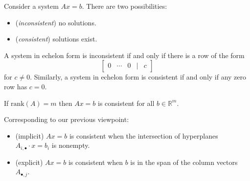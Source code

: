 \documentclass[12pt]{article}
\begin{document}
\begin{definition}
	Consider a system $Ax=b$. There are two possibilities:
	\begin{itemize}
		\item (\emph{inconsistent}) no solutions. 
		\item (\emph{consistent}) solutions exist.
	\end{itemize}
\end{definition}

\begin{corollary}
	A system in echelon form is inconsistent if and only if there is a row of the form 
	\begin{equation*}
		\begin{bmatrix} 0 & \cdots & 0 & | & c \end{bmatrix}
	\end{equation*}
	for $c\neq 0$. Similarly, a system in echelon form is consistent if and only if any zero row has $c=0$.
\end{corollary}

\begin{corollary}
	If $\text{rank}(A)=m$ then $Ax=b$ is consistent for all $b\in\mathbb{R}^m$.
\end{corollary}

\begin{remark}
	Corresponding to our previous viewpoint:
	\begin{itemize}
		\item (implicit) $Ax=b$ is consistent when the intersection of hyperplanes $A_{i,\bullet}\cdot x=b_i$ is nonempty.
		\item (explicit) $Ax=b$ is consistent when $b$ is in the span of the column vectors $A_{\bullet,j}$.
	\end{itemize}
\end{remark}
\end{document}
